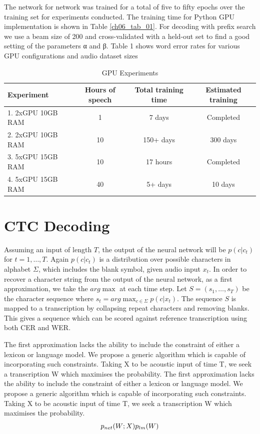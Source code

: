 The network for network was trained for a total of five to fifty epochs over the training set for experiments conducted. The training time for Python GPU implementation is shown in Table \ref{ch06_tab_01}.  For decoding with prefix search we use a beam size of 200 and cross-validated with a held-out set to find a good setting of the parameters α and β. Table 1 shows word error rates for various GPU configurations and audio dataset sizes


\begin{table}
  \caption{GPU Experiments}
  \label{tab_c6_01_training}
\begin{tabular}{lccc}
\toprule
Experiment & Hours of speech & Total training time & Estimated training\\
\midrule
1. 2xGPU 10GB RAM & 1 & 7 days & Completed\\
2. 2xGPU 10GB RAM & 10 & 150+ days & 300 days\\
3. 5xGPU 15GB RAM & 10 & 17 hours & Completed\\
4. 5xGPU 15GB RAM & 40 & 5+ days & 10 days\\
\bottomrule
\end{tabular}
\end{table}
\section{CTC Decoding}

Assuming an input of length $T$, the output of the neural network will be $p(c|c_t)$ for $t=1,\dots,T$. Again $p(c|c_t)$ is a distribution over possible characters in alphabet $\Sigma$, which includes the blank symbol, given audio input $x_t$. In order to recover a character string from the output of the neural network, as a first approximation, we take the $arg\max$ at each time step. Let $S=(s_1,\dots,s_T)$ be the character sequence where $s_t=arg\max_{c\in\Sigma}p(c|x_t)$. The sequence $S$ is mapped to a transcription by collapsing repeat characters and removing blanks. This gives a sequence which can be scored against reference transcription using both CER and WER.

The first approximation lacks the ability to include the constraint of either a lexicon or language model. We propose a generic algorithm which is capable of incorporating such constraints. Taking X to be acoustic input of time T, we seek a transcription W which maximises the probability.
The first approximation lacks the ability to include the constraint of either a lexicon or language model. We propose a generic algorithm which is capable of incorporating such constraints. Taking X to be acoustic input of time T, we seek a transcription W which maximises the probability.
\begin{equation}
$$p_{net}(W;X)p_{lm}(W)$$
\label{eqn_c6_brnn06}
\end{equation}

